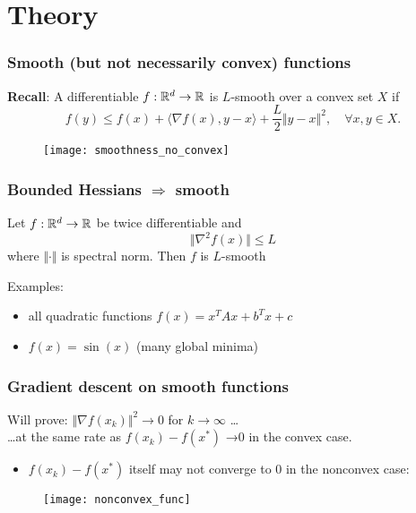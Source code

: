 \documentclass[aspectratio=149]{beamer}
\begin{document}
\section{Theory}%
\label{sec:}

\begin{frame}
  \frametitle{Smooth (but not necessarily convex) functions}
  \textbf{Recall}: A differentiable $f : \mathbb{R}^d \to \mathbb{R}$ is $L$-smooth over a convex set $X$ if
  \begin{equation}
    f(y) \le f(x) + \langle \nabla f(x), y- x \rangle + \frac{L}{2} \Vert y-x \Vert^2, \quad \forall x,y \in X.
  \end{equation}
  \begin{figure}[ht]
    \centering
    \texttt{[image: smoothness\_no\_convex]}
  \end{figure}
\end{frame}


\begin{frame}
  \frametitle{Bounded Hessians $\Rightarrow$ smooth}
  \begin{lemma}%
    Let $f: \mathbb{R}^d \to \mathbb{R}$ be twice differentiable and
    \begin{equation}
      \Vert \nabla^2 f(x) \Vert \le L
    \end{equation}
    where $\Vert \cdot \Vert$ is spectral norm. Then $f$ is $L$-smooth
  \end{lemma}

  Examples:
  \begin{itemize}
    \item all quadratic functions $f(x)= x^T Ax + b^T x + c$
    \item $f(x) = \sin (x)$ (many global minima)
  \end{itemize}
\end{frame}


\begin{frame}
  \frametitle{Gradient descent on smooth functions}
  Will prove: $\Vert \nabla f(x_k) \Vert^2 \to 0$ for $k\to \infty$ \ldots \\
  \ldots at the same rate as $f(x_k) -f(x^*)$ →0 in the convex case.
  \begin{itemize}
    \item $f(x_k) -f(x^*)$ itself may not converge to 0 in the nonconvex case:
  \end{itemize}
  \begin{figure}[ht]
    \centering
    \texttt{[image: nonconvex\_func]}
    \caption{\label{fig:label} }
  \end{figure}
\end{frame}
\end{document}
